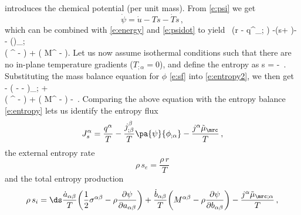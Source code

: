 \documentclass[11pt]{article}
\begin{document}
introduces the chemical potential (per unit mass).
%
From \eqref{e:psi} we get 
\begin{equation} \label{e:psi2}
\dot{\psi} = \dot{u} - T \dot{s} - \dot{T}s\,,
\end{equation}
%
which can be combined with \eqref{e:energy} and \eqref{e:psidot} to yield 
\label{e:entropy2}
\rho\,  \is\ds  {} \big(\rho r - q^\alpha_{; \alpha}\big) -\bigg(s+ \bigg)- \rho{} \dot\phi - \bigg(\rho \pa{\psi}{\phi_{;\alpha}}\dot\phi\bigg)_{\!\!;\alpha}\\[4mm]
\plus {} \bigg(  \sigma^{\alpha \beta} - \rho {}\bigg)
+  \bigg( M^{\alpha \beta} - \rho {} \bigg).
\eqe
%
Let us now assume isothermal conditions such that there are no in-plane temperature gradients ($T_{;\alpha}=0$), and define the entropy as
s = \ds - \,.
\eqe
Substituting the mass balance equation for $\phi$ \eqref{e:sf} into \eqref{e:entropy2}, we then get 
\label{eq:local-entropy-balance-2}
\rho\,
\is - \ds\bigg( -  \pa{\psi}{\phi_{;\alpha}}  - \bigg)_{\!\!; \alpha} +  \\[4mm]
\plus \ds{} \bigg( \sigma^{\alpha \beta} - \rho {}\bigg)
	  +  \bigg( M^{\alpha \beta} - \rho {} \bigg) 
	  - \ds{}\,.
\eqe
Comparing the above equation with the entropy balance \eqref{e:entropy} lets us identify the entropy flux 
\begin{equation}
J_s^{\alpha} = \frac{q^\alpha}{T}  - \frac{j^\beta_{;\beta}}{T} \pa{\psi}{\phi_{;\alpha}} -\frac{j^\alpha\tilde\mu_\mrc}{T}\,,
\end{equation}
%
the external entropy rate
\begin{equation}
\rho\,s_e = \frac{\rho\,r}{T}
\end{equation}
%
and the total entropy production
\begin{equation}\label{eq:ent-prod}
\rho\,s_i = \ds\frac{\dot{a}_{\alpha \beta}}{T} \bigg(\frac{1}{2} \sigma^{\alpha \beta} - \rho \dfrac{\partial \psi}{\partial a_{\alpha \beta}}\bigg)
	  + \frac{\dot{b}_{\alpha \beta}}{T} \bigg( M^{\alpha \beta} - \rho \frac{\partial \psi}{\partial b_{\alpha \beta}} \bigg) 
	  - \frac{j^\alpha\tilde\mu_{\mrc;\alpha}}{T}\,,
\end{equation}
\end{document}

